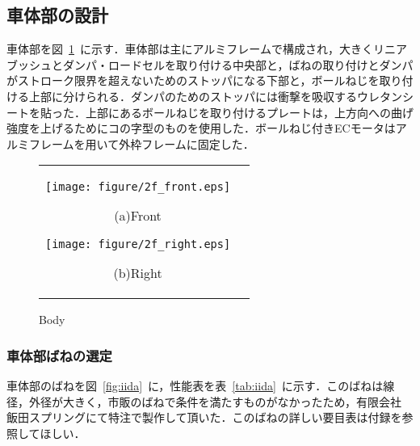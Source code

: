 \documentclass[a4paper,12pt]{article_vdlab_sotsuron}
\begin{document}
\newpage
\subsection{車体部の設計}
車体部を図~\ref{fig:2f}~に示す．車体部は主にアルミフレームで構成され，大きくリニアブッシュとダンパ・ロードセルを取り付ける中央部と，ばねの取り付けとダンパがストローク限界を超えないためのストッパになる下部と，ボールねじを取り付ける上部に分けられる．ダンパのためのストッパには衝撃を吸収するウレタンシートを貼った．上部にあるボールねじを取り付けるプレートは，上方向への曲げ強度を上げるためにコの字型のものを使用した．ボールねじ付きECモータはアルミフレームを用いて外枠フレームに固定した．

\vspace*{10mm}
\begin{figure}[h!]
  \begin{tabular}{cc}
  \begin{minipage}{0.5\hsize}
  \begin{center} 
    \texttt{[image: figure/2f\_front.eps]}
    \end{center}
    \begin{center}
    \vspace{3mm}
    \ (a)Front\
    \end{center}
  \end{minipage}
  \begin{minipage}{0.5\hsize}
     \begin{center}
      \texttt{[image: figure/2f\_right.eps]}
      \end{center}
      \begin{center}
      \vspace{3mm}
      \ (b)Right\
    \end{center}
  \end{minipage}
  \end{tabular}
  \vspace*{3mm}
  \caption{Body}
    \label{fig:2f}
 \end{figure}

\newpage
\subsubsection{車体部ばねの選定}
車体部のばねを図~\ref{fig:iida}~に，性能表を表~\ref{tab:iida}~に示す．このばねは線径，外径が大きく，市販のばねで条件を満たすものがなかったため，有限会社 飯田スプリングにて特注で製作して頂いた．このばねの詳しい要目表は付録を参照してほしい．
\end{document}
